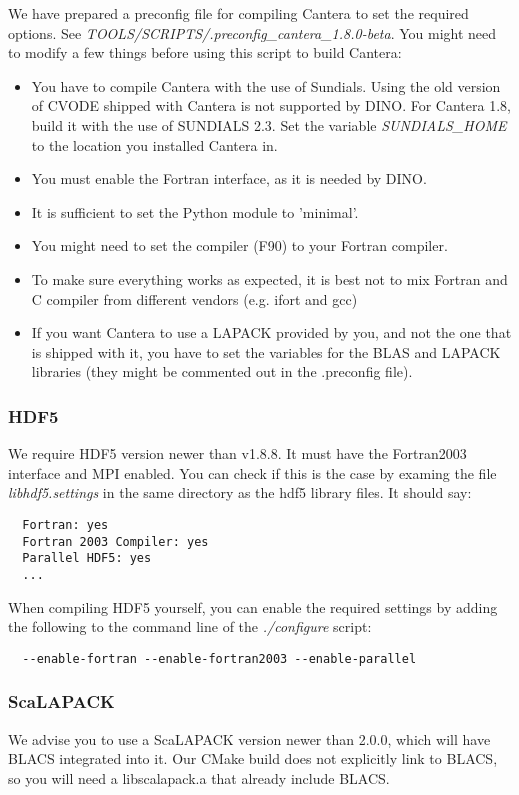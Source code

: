 We have prepared a preconfig file for compiling Cantera to set the required options. See \textit{TOOLS/SCRIPTS/.preconfig\_cantera\_1.8.0-beta}. You might need to modify a few things before using this script to build Cantera:
\begin{itemize}
\item You have to compile Cantera with the use of Sundials. Using the old version of CVODE shipped with Cantera is not supported by DINO. For Cantera 1.8, build it with the use of SUNDIALS 2.3. Set the variable \textit{SUNDIALS\_HOME} to the location you installed Cantera in.
\item You must enable the Fortran interface, as it is needed by DINO.
\item It is sufficient to set the Python module to 'minimal'.
\item You might need to set the compiler (F90) to your Fortran compiler.
\item To make sure everything works as expected, it is best not to mix Fortran and C compiler from different vendors (e.g. ifort and gcc)
\item If you want Cantera to use a LAPACK provided by you, and not the one that is shipped with it, you have to set the variables for the BLAS and LAPACK libraries (they might be commented out in the .preconfig file).
\end{itemize}

\subsubsection{HDF5}
We require HDF5 version newer than v1.8.8. It must have the Fortran2003 interface and MPI enabled. You can check if this is the case by examing the file \textit{libhdf5.settings} in the same directory as the hdf5 library files. It should say:
\begin{lstlisting}
  Fortran: yes
  Fortran 2003 Compiler: yes
  Parallel HDF5: yes
  ...
\end{lstlisting}
When compiling HDF5 yourself, you can enable the required settings by adding the following to the command line of the \textit{./configure} script:
\begin{lstlisting}
  --enable-fortran --enable-fortran2003 --enable-parallel
\end{lstlisting}

\subsubsection{ScaLAPACK}
We advise you to use a ScaLAPACK version newer than 2.0.0, which will have BLACS integrated into it. Our CMake build does not explicitly link to BLACS, so you will need a libscalapack.a that already include BLACS.

